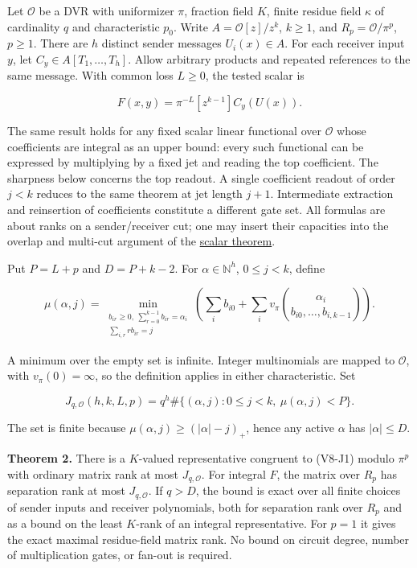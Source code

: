 \documentclass[11pt,a4paper]{article}
\begin{document}
Let \(\mathcal O\) be a DVR with uniformizer \(\pi\), fraction field
\(K\), finite residue field \(\kappa\) of cardinality \(q\) and
characteristic \(p_0\). Write \(A=\mathcal O[z]/z^k\), \(k\ge1\), and
\(R_p=\mathcal O/\pi^p\), \(p\ge1\). There are \(h\) distinct sender
messages \(U_i(x)\in A\). For each receiver input \(y\), let
\(C_y\in A[T_1,\ldots,T_h]\). Allow arbitrary products and repeated
references to the same message. With common loss \(L\ge0\), the tested
scalar is

\[
                  F(x,y)=\pi^{-L}[z^{k-1}]C_y(U(x)).
                                                                    \tag{V8-J1}
\]

The same result holds for any fixed scalar linear functional over
\(\mathcal O\) whose coefficients are integral as an upper bound: every
such functional can be expressed by multiplying by a fixed jet and
reading the top coefficient. The sharpness below concerns the top
readout. A single coefficient readout of order \(j<k\) reduces to the
same theorem at jet length \(j+1\). Intermediate extraction and
reinsertion of coefficients constitute a different gate set. All
formulas are about ranks on a sender/receiver cut; one may insert their
capacities into the overlap and multi-cut argument of the
\hyperref[v8-section-nonlinear-budget]{scalar theorem}.

Put \(P=L+p\) and \(D=P+k-2\). For \(\alpha\in\mathbb N^h\),
\(0\le j<k\), define

\[
 \mu(\alpha,j)=
 \min_{\substack{b_{ir}\ge0,\ \sum_{r=0}^{k-1} b_{ir}=\alpha_i\\
                         \sum_{i,r} r b_{ir}=j}}
 \left(\sum_i b_{i0}
      +\sum_i v_\pi\!\binom{\alpha_i}{b_{i0},\ldots,b_{i,k-1}}\right).
                                                                    \tag{V8-J2}
\]

A minimum over the empty set is infinite. Integer multinomials are
mapped to \(\mathcal O\), with \(v_\pi(0)=\infty\), so the definition
applies in either characteristic. Set

\[
              J_{q,\mathcal O}(h,k,L,p)
                =q^h\#\{(\alpha,j):0\le j<k,\ \mu(\alpha,j)<P\}.
                                                                    \tag{V8-J3}
\]

The set is finite because \(\mu(\alpha,j)\ge(|\alpha|-j)_+\), hence any
active \(\alpha\) has \(|\alpha|\le D\).

\textbf{Theorem 2.} There is a \(K\)-valued representative congruent to
(V8-J1) modulo \(\pi^p\) with ordinary matrix rank at most
\(J_{q,\mathcal O}\). For integral \(F\), the matrix over \(R_p\) has
separation rank at most \(J_{q,\mathcal O}\). If \(q>D\), the bound is
exact over all finite choices of sender inputs and receiver polynomials,
both for separation rank over \(R_p\) and as a bound on the least
\(K\)-rank of an integral representative. For \(p=1\) it gives the exact
maximal residue-field matrix rank. No bound on circuit degree, number of
multiplication gates, or fan-out is required.
\end{document}
